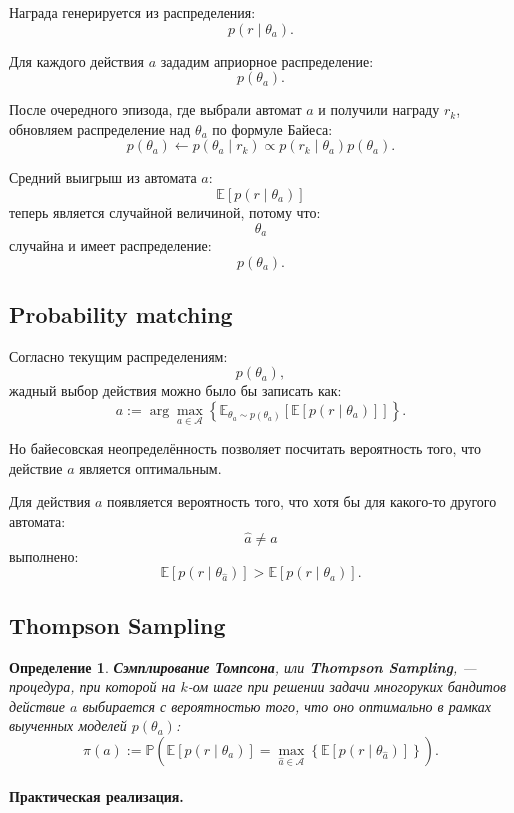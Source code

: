 \documentclass[12pt,a4paper]{article}
\newtheorem{definition}{Определение}
\begin{document}
Награда генерируется из распределения:
\[
p(r\mid \theta_a).
\]

Для каждого действия $a$ зададим априорное распределение:
\[
p(\theta_a).
\]

После очередного эпизода, где выбрали автомат $a$ и получили награду $r_k$, обновляем распределение над $\theta_a$ по формуле Байеса:
\[
p(\theta_a)
\leftarrow
p(\theta_a\mid r_k)
\propto
p(r_k\mid\theta_a)p(\theta_a).
\]

Средний выигрыш из автомата $a$:
\[
\mathbb E
\left[
p(r\mid\theta_a)
\right]
\]
теперь является случайной величиной, потому что:
\[
\theta_a
\]
случайна и имеет распределение:
\[
p(\theta_a).
\]

\subsection{Probability matching}

Согласно текущим распределениям:
\[
p(\theta_a),
\]
жадный выбор действия можно было бы записать как:
\[
a
:=
\arg\max_{a\in\mathcal A}
\left\{
\mathbb E_{\theta_a\sim p(\theta_a)}
\left[
\mathbb E
\left[
p(r\mid\theta_a)
\right]
\right]
\right\}.
\]

Но байесовская неопределённость позволяет посчитать вероятность того, что действие $a$ является оптимальным.

Для действия $a$ появляется вероятность того, что хотя бы для какого-то другого автомата:
\[
\hat a\ne a
\]
выполнено:
\[
\mathbb E
\left[
p(r\mid\theta_{\hat a})
\right]
>
\mathbb E
\left[
p(r\mid\theta_a)
\right].
\]

\subsection{Thompson Sampling}

\begin{definition}
\textbf{Сэмплирование Томпсона}, или \textbf{Thompson Sampling}, --- процедура, при которой на $k$-ом шаге при решении задачи многоруких бандитов действие $a$ выбирается с вероятностью того, что оно оптимально в рамках выученных моделей $p(\theta_a)$:
\[
\pi(a)
:=
\mathbb P
\left(
\mathbb E
\left[
p(r\mid\theta_a)
\right]
=
\max_{\hat a\in\mathcal A}
\left\{
\mathbb E
\left[
p(r\mid\theta_{\hat a})
\right]
\right\}
\right).
\]
\end{definition}

\paragraph{Практическая реализация.}
\end{document}
